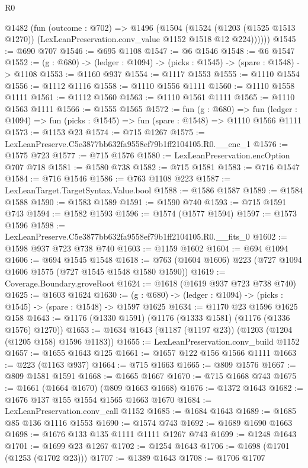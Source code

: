 \begin{lexlean}{R0}
\begin{coremodule}
      @1482
        (fun (outcome : @702) =>
        @1496
          (@1504
            (@1524
              (@1203 (@1525 @1513 @1270))
              (LexLeanPreservation.conv_value @1152 @1518 @12 @224))))))
@1545 := @690 @707
@1546 := @695 @1108
@1547 := @6 @1546
@1548 := @6 @1547
@1552 := (g : @680) -> (ledger : @1094) -> (picks : @1545) -> (spare : @1548) -> @1108
@1553 := @1160 @937
@1554 := @1117 @1553
@1555 := @1110 @1554
@1556 := @1112 @1116
@1558 := @1110 @1556 @1111
@1560 := @1110 @1558 @1111
@1561 := @1112 @1560
@1563 := @1110 @1561 @1111
@1565 := @1110 @1563 @1111
@1566 := @1555 @1565
@1572 := fun (g : @680) =>
  fun (ledger : @1094) => fun (picks : @1545) => fun (spare : @1548) => @1110 @1566 @1111
@1573 := @1153 @23
@1574 := @715 @1267
@1575 := LexLeanPreserve.C5e3877bb632fa9558ef79b1ff2104105.R0.__enc_1
@1576 := @1575 @723
@1577 := @715 @1576
@1580 := LexLeanPreservation.encOption @707 @718
@1581 := @1580 @738
@1582 := @715 @1581
@1583 := @716 @1547
@1584 := @716 @1546
@1586 := @763 @1108 @223
@1587 := LexLeanTarget.TargetSyntax.Value.bool
@1588 := @1586 @1587
@1589 := @1584 @1588
@1590 := @1583 @1589
@1591 := @1590 @740
@1593 := @715 @1591 @743
@1594 := @1582 @1593
@1596 := @1574 (@1577 @1594)
@1597 := @1573 @1596
@1598 := LexLeanPreserve.C5e3877bb632fa9558ef79b1ff2104105.R0.__fits_0
@1602 := @1598 @937 @723 @738 @740
@1603 := @1159 @1602
@1604 := @694 @1094
@1606 := @694 @1545 @1548
@1618 := @763 (@1604 @1606) @223 (@727 @1094 @1606 @1575 (@727 @1545 @1548 @1580 @1590))
@1619 := Coverage.Boundary.groveRoot
@1624 := @1618 (@1619 @937 @723 @738 @740)
@1625 := @1603 @1624
@1630 := (g : @680) -> (ledger : @1094) -> (picks : @1545) -> (spare : @1548) -> @1597 @1625
@1634 := @1170 @23 @1596 @1625 @158
@1643 := @1176 (@1330 @1591) (@1176 (@1333 @1581) (@1176 (@1336 @1576) @1270))
@1653 := @1634 @1643 (@1187 (@1197 @23)) (@1203 (@1204 (@1205 @158) @1596 @1183))
@1655 := LexLeanPreservation.conv_build @1152
@1657 := @1655 @1643 @125
@1661 := @1657 @122 @156 @1566 @1111
@1663 := @223 (@1163 @937)
@1664 := @715 @1663
@1665 := @809 @1576
@1667 := @809 @1581 @1591
@1668 := @1665 @1667
@1670 := @715 @1668 @743
@1675 := @1661 (@1664 @1670) (@809 @1663 @1668)
@1676 := @1372 @1643
@1682 := @1676 @137 @155 @1554 @1565 @1663 @1670
@1684 := LexLeanPreservation.conv_call @1152
@1685 := @1684 @1643
@1689 := @1685 @85 @136 @1116 @1553
@1690 := @1574 @743
@1692 := @1689 @1690 @1663
@1698 := @1676 @133 @135 @1111 @1111 @1267 @743
@1699 := @1248 @1643
@1701 := @1699 @23 @1267
@1702 := @1254 @1643
@1706 := @1698 (@1701 (@1253 (@1702 @23)))
@1707 := @1389 @1643
@1708 := @1706 @1707

\end{coremodule}
\end{lexlean}
